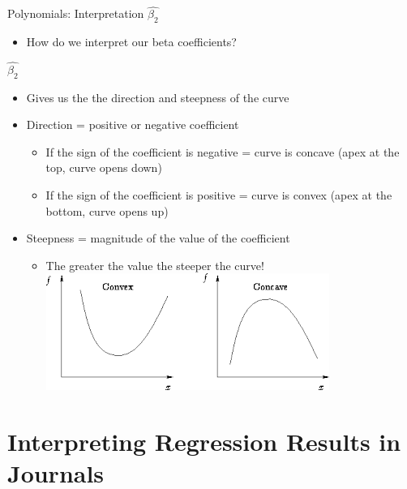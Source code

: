 \documentclass[8pt,ignorenonframetext,dvipsnames]{beamer}
\providecommand{\tightlist}{%
  \setlength{\itemsep}{0pt}\setlength{\parskip}{0pt}}
\renewcommand{\textbf}[1]{{\color{darkgray}\bfseries\fontfamily{Montserrat-TOsF}#1}}
\let\olditem\item
\renewcommand{\item}{%
  \olditem\vspace{4pt}
}
\begin{document}
\begin{frame}{Polynomials: Interpretation \(\hat{\beta_2}\)}
\protect\hypertarget{polynomials-interpretation-hatbeta_2}{}

\begin{itemize}
\tightlist
\item
  How do we interpret our beta coefficients?
\end{itemize}

\medskip

\textbf{\(\hat{\beta_2}\)}

\begin{itemize}
\tightlist
\item
  Gives us the the direction and steepness of the curve
\item
  Direction = positive or negative coefficient

  \begin{itemize}
  \tightlist
  \item
    If the sign of the coefficient is negative = curve is concave (apex
    at the top, curve opens down)
  \item
    If the sign of the coefficient is positive = curve is convex (apex
    at the bottom, curve opens up)
  \end{itemize}
\item
  Steepness = magnitude of the value of the coefficient

  \begin{itemize}
  \tightlist
  \item
    The greater the value the steeper the curve!
    \includegraphics{convex.png}
  \end{itemize}
\end{itemize}

\end{frame}

\hypertarget{interpreting-regression-results-in-journals}{%
\section{Interpreting Regression Results in
Journals}\label{interpreting-regression-results-in-journals}}
\end{document}
